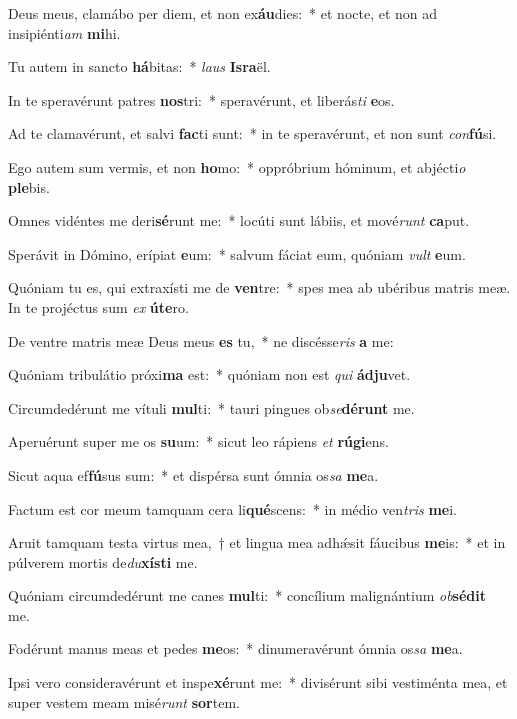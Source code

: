 \item Deus meus, clamábo per diem, et non ex\textbf{áu}dies:~* et nocte, et non ad insipiénti\textit{am} \textbf{mi}hi.
\item Tu autem in sancto \textbf{há}bitas:~* \textit{laus} \textbf{Is}\textbf{ra}ël.
\item In te speravérunt patres \textbf{nos}tri:~* speravérunt, et liberás\textit{ti} \textbf{e}os.
\item Ad te clamavérunt, et salvi \textbf{fac}ti sunt:~* in te speravérunt, et non sunt \textit{con}\textbf{fú}si.
\item Ego autem sum vermis, et non \textbf{ho}mo:~* oppróbrium hóminum, et abjécti\textit{o} \textbf{ple}bis.
\item Omnes vidéntes me deri\textbf{sé}runt me:~* locúti sunt lábiis, et mové\textit{runt} \textbf{ca}put.
\item Sperávit in Dómino, erípiat \textbf{e}um:~* salvum fáciat eum, quóniam \textit{vult} \textbf{e}um.
\item Quóniam tu es, qui extraxísti me de \textbf{ven}tre:~* spes mea ab ubéribus matris meæ. In te projéctus sum \textit{ex} \textbf{ú}\textbf{te}ro.
\item De ventre matris meæ Deus meus \textbf{es} tu,~* ne discésse\textit{ris} \textbf{a} me:
\item Quóniam tribulátio próxi\textbf{ma} est:~* quóniam non est \textit{qui} \textbf{ád}\textbf{ju}vet.
\item Circumdedérunt me vítuli \textbf{mul}ti:~* tauri pingues ob\textit{se}\textbf{dé}\textbf{runt} me.
\item Aperuérunt super me os \textbf{su}um:~* sicut leo rápiens \textit{et} \textbf{rú}\textbf{gi}ens.
\item Sicut aqua ef\textbf{fú}sus sum:~* et dispérsa sunt ómnia os\textit{sa} \textbf{me}a.
\item Factum est cor meum tamquam cera li\textbf{qué}scens:~* in médio ven\textit{tris} \textbf{me}i.
\item Aruit tamquam testa virtus mea,~† et lingua mea adhǽsit fáucibus \textbf{me}is:~* et in púlverem mortis de\textit{du}\textbf{xís}\textbf{ti} me.
\item Quóniam circumdedérunt me canes \textbf{mul}ti:~* concílium malignántium \textit{ob}\textbf{sé}\textbf{dit} me.
\item Fodérunt manus meas et pedes \textbf{me}os:~* dinumeravérunt ómnia os\textit{sa} \textbf{me}a.
\item Ipsi vero consideravérunt et inspe\textbf{xé}runt me:~* divisérunt sibi vestiménta mea, et super vestem meam misé\textit{runt} \textbf{sor}tem.

